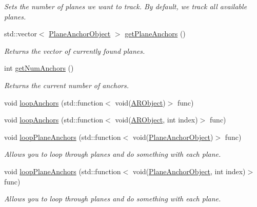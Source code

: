 \begin{DoxyCompactItemize}
\begin{DoxyCompactList}\small\item\em Sets the number of planes we want to track. By default, we track all available planes. \end{DoxyCompactList}\item 
std\+::vector$<$ \hyperlink{struct_a_r_objects_1_1_plane_anchor_object}{Plane\+Anchor\+Object} $>$ \hyperlink{class_a_r_core_1_1_a_r_anchor_manager_a46a02253729234aef5617512f48e9211}{get\+Plane\+Anchors} ()
\begin{DoxyCompactList}\small\item\em Returns the vector of currently found planes. \end{DoxyCompactList}\item 
int \hyperlink{class_a_r_core_1_1_a_r_anchor_manager_a68b5139137f46a426374178cd43b653d}{get\+Num\+Anchors} ()
\begin{DoxyCompactList}\small\item\em Returns the current number of anchors. \end{DoxyCompactList}\item 
void \hyperlink{class_a_r_core_1_1_a_r_anchor_manager_a687246a5f0aacaac63053c0e05081e11}{loop\+Anchors} (std\+::function$<$ void(\hyperlink{struct_a_r_objects_1_1_a_r_object}{A\+R\+Object})$>$ func)
\item 
void \hyperlink{class_a_r_core_1_1_a_r_anchor_manager_a03ee4092b5d958f8b1467e0a0e62f9b9}{loop\+Anchors} (std\+::function$<$ void(\hyperlink{struct_a_r_objects_1_1_a_r_object}{A\+R\+Object}, int index)$>$ func)
\item 
void \hyperlink{class_a_r_core_1_1_a_r_anchor_manager_a170e30f7226b84eaede22392f08d5521}{loop\+Plane\+Anchors} (std\+::function$<$ void(\hyperlink{struct_a_r_objects_1_1_plane_anchor_object}{Plane\+Anchor\+Object})$>$ func)
\begin{DoxyCompactList}\small\item\em Allows you to loop through planes and do something with each plane. \end{DoxyCompactList}\item 
void \hyperlink{class_a_r_core_1_1_a_r_anchor_manager_a6f3215e085a92b1165b3da58138adbfc}{loop\+Plane\+Anchors} (std\+::function$<$ void(\hyperlink{struct_a_r_objects_1_1_plane_anchor_object}{Plane\+Anchor\+Object}, int index)$>$ func)
\begin{DoxyCompactList}\small\item\em Allows you to loop through planes and do something with each plane. \end{DoxyCompactList}\item 

\end{DoxyCompactItemize}
